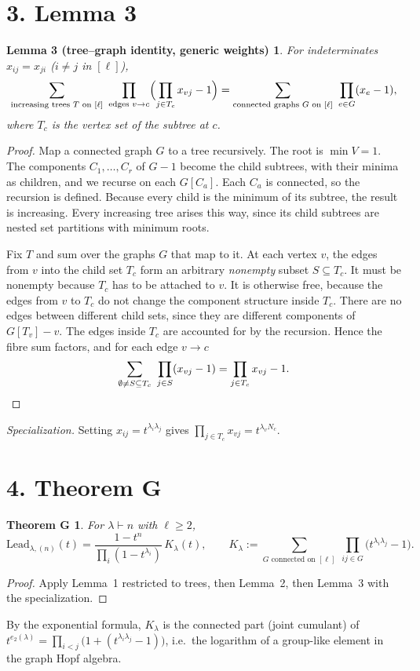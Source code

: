\documentclass[10pt]{article}
\newcommand{\Lead}{\mathrm{Lead}}
\newtheorem*{lemma3}{Lemma 3 (tree--graph identity, generic weights)}
\newtheorem*{thmG}{Theorem G}
\begin{document}
\section*{3. Lemma 3}
\begin{lemma3}
For indeterminates $x_{ij}=x_{ji}$ ($i\ne j$ in $[\ell]$),
\[
\sum_{\text{increasing trees }T\text{ on }[\ell]}\ \prod_{\text{edges }v\to c}\Bigl(\prod_{j\in T_c}x_{vj}-1\Bigr)
=\sum_{\text{connected graphs }G\text{ on }[\ell]}\ \prod_{e\in G}(x_e-1),
\]
where $T_c$ is the vertex set of the subtree at $c$.
\end{lemma3}
\begin{proof}
Map a connected graph $G$ to a tree recursively. The root is $\min V=1$. The components $C_1,\dots,C_r$ of $G-1$ become
the child subtrees, with their minima as children, and we recurse on each $G[C_a]$. Each $C_a$ is connected, so the
recursion is defined. Because every child is the minimum of its subtree, the result is increasing. Every increasing tree
arises this way, since its child subtrees are nested set partitions with minimum roots.

Fix $T$ and sum over the graphs $G$ that map to it. At each vertex $v$, the edges from $v$ into the child set $T_c$ form
an arbitrary \emph{nonempty} subset $S\subseteq T_c$. It must be nonempty because $T_c$ has to be attached to $v$. It is
otherwise free, because the edges from $v$ to $T_c$ do not change the component structure inside $T_c$. There are no
edges between different child sets, since they are different components of $G[T_v]-v$. The edges inside $T_c$ are
accounted for by the recursion. Hence the fibre sum factors, and for each edge $v\to c$
\[
\sum_{\emptyset\ne S\subseteq T_c}\ \prod_{j\in S}(x_{vj}-1)=\prod_{j\in T_c}x_{vj}-1.\qedhere
\]
\end{proof}
\noindent\emph{Specialization.} Setting $x_{ij}=t^{\lambda_i\lambda_j}$ gives $\prod_{j\in T_c}x_{vj}=t^{\lambda_vN_c}$.

\section*{4. Theorem G}
\begin{thmG}
For $\lambda\vdash n$ with $\ell\ge2$,
\[
\Lead_{\lambda,(n)}(t)=\frac{1-t^n}{\prod_i(1-t^{\lambda_i})}\,K_\lambda(t),\qquad
K_\lambda:=\sum_{G\text{ connected on }[\ell]}\ \prod_{ij\in G}\bigl(t^{\lambda_i\lambda_j}-1\bigr).
\]
\end{thmG}
\begin{proof}
Apply Lemma~1 restricted to trees, then Lemma~2, then Lemma~3 with the specialization.
\end{proof}
By the exponential formula, $K_\lambda$ is the connected part (joint cumulant) of
$t^{e_2(\lambda)}=\prod_{i<j}\bigl(1+(t^{\lambda_i\lambda_j}-1)\bigr)$, i.e.\ the logarithm of a group-like element in
the graph Hopf algebra.
\end{document}
